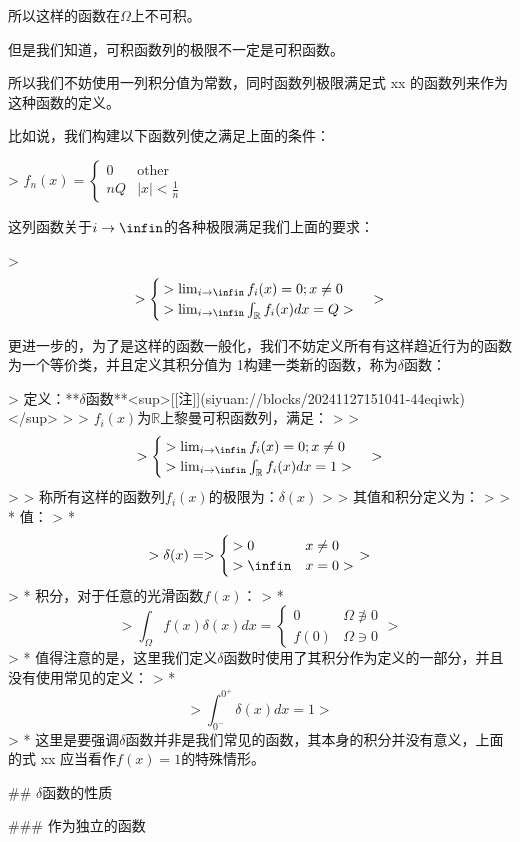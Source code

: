 \documentclass[lang=cn,10pt,newtx,bibend=biber,device=pad]{elegantbook}
\begin{document}
所以这样的函数在$\Omega$上不可积。

但是我们知道，可积函数列的极限不一定是可积函数。

所以我们不妨使用一列积分值为常数，同时函数列极限满足式 xx 的函数列来作为这种函数的定义。

比如说，我们构建以下函数列使之满足上面的条件：

> $f_n(x) =  \begin{cases} 0 &\text{other}\\ nQ &\text{$|x|<\frac{1}{n}$}  \end{cases}$

这列函数关于$i\rightarrow \infin$的各种极限满足我们上面的要求：

> $$
> \begin{cases}
> \lim_{i\rightarrow\infin}f_i(x)=0;x\neq0\\
> \lim_{i\rightarrow\infin}\int_{\mathbb{R}}f_i(x)dx = Q
> \end{cases}
> $$

更进一步的，为了是这样的函数一般化，我们不妨定义所有有这样趋近行为的函数为一个等价类，并且定义其积分值为 1构建一类新的函数，称为$\delta$函数：

> 定义：**$\delta$函数**​<sup>[[注]](siyuan://blocks/20241127151041-44eqiwk)</sup>
>
> ${f_i(x)}$为$\mathbb{R}$上黎曼可积函数列，满足：
>
> $$
> \begin{cases}
> \lim_{i\rightarrow\infin}f_i(x)=0;x\neq0\\
> \lim_{i\rightarrow\infin}\int_{\mathbb{R}}f_i(x)dx = 1
> \end{cases}
> $$
>
> 称所有这样的函数列${f_i(x)}$的极限为：$\delta(x)$
>
> 其值和积分定义为：
>
> * 值：
> * $$
>   \delta(x)=
>   \begin{cases}
>   0 &x\neq0 \\
>   \infin &x=0
>   \end{cases}
>   $$
> * 积分，对于任意的光滑函数$f(x)$：
> * $$
>   \int_{\Omega}f(x)\delta(x)dx=\begin{cases}0 & \Omega\not\owns0\\f(0)&\Omega\owns 0\end{cases}
>   $$
> * 值得注意的是，这里我们定义$\delta$函数时使用了其积分作为定义的一部分，并且没有使用常见的定义：
> * $$
>   \int_{0^-}^{0^+}\delta(x)dx=1
>   $$
> * 这里是要强调$\delta$函数并非是我们常见的函数，其本身的积分并没有意义，上面的式 xx 应当看作$f(x)=1$的特殊情形。

## $\delta$函数的性质

### 作为独立的函数
\end{document}
